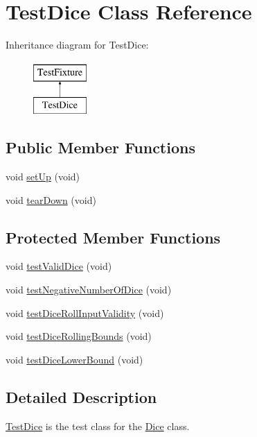 \hypertarget{class_test_dice}{}\section{Test\+Dice Class Reference}
\label{class_test_dice}
Inheritance diagram for Test\+Dice\+:\begin{figure}[H]
\begin{center}
\leavevmode
\includegraphics[height=2.000000cm]{class_test_dice}
\end{center}
\end{figure}
\subsection*{Public Member Functions}
\begin{DoxyCompactItemize}
\item 
void \hyperlink{class_test_dice_ab667ce059357171f1d8518c052e50f64}{set\+Up} (void)
\item 
void \hyperlink{class_test_dice_af92d20c1d04e258061ebba44ac109d43}{tear\+Down} (void)
\end{DoxyCompactItemize}
\subsection*{Protected Member Functions}
\begin{DoxyCompactItemize}
\item 
void \hyperlink{class_test_dice_a7a6a244b7820f9638b424ff16f3bb602}{test\+Valid\+Dice} (void)
\item 
void \hyperlink{class_test_dice_ac7ebcb4fcc5e519bb3f7cc6b7924ade7}{test\+Negative\+Number\+Of\+Dice} (void)
\item 
void \hyperlink{class_test_dice_a1c5bd286c8d9714b97b67ddbfccb12f6}{test\+Dice\+Roll\+Input\+Validity} (void)
\item 
void \hyperlink{class_test_dice_a6e81399d8157900629dee02c92ce5f8a}{test\+Dice\+Rolling\+Bounds} (void)
\item 
void \hyperlink{class_test_dice_aac292c8e6ca7593d523aedd526f24500}{test\+Dice\+Lower\+Bound} (void)
\end{DoxyCompactItemize}


\subsection{Detailed Description}
\hyperlink{class_test_dice}{Test\+Dice} is the test class for the \hyperlink{class_dice}{Dice} class. 

